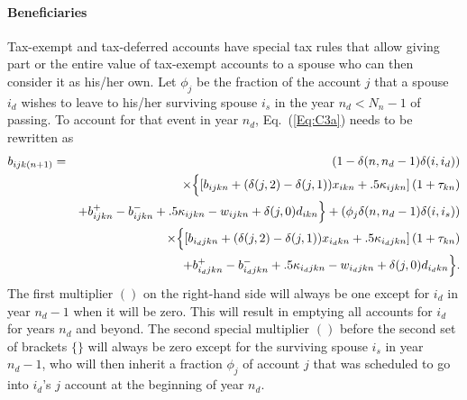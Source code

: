 \documentclass{article}[fleqn,12pt]
\begin{document}
\paragraph*{Beneficiaries}
Tax-exempt and tax-deferred accounts have special tax rules that allow giving part
or the entire value of
tax-exempt accounts to a spouse who can then consider it as his/her own.
Let $\phi_j$ be the fraction of the account $j$ that a spouse $i_d$ wishes
to leave to his/her surviving spouse $i_s$
in the year $n_d < N_n - 1$ of passing. 
To account for that event in year $n_d$, Eq.~(\ref{Eq:C3a}) needs to be rewritten as
\begin{eqnarray}
	b_{ijk(n+1)} &=& (1 - \delta(n, n_d-1)\delta(i, i_d)) \nonumber \\
	&&\times \Bigl\{\left[b_{ijkn} + (\delta(j, 2) - \delta(j, 1))x_{ikn}
	+ .5\kappa_{ijkn}\right](1 + \tau_{kn}) 
	\nonumber \\
	&& +  b^+_{ijkn} - b^-_{ijkn} + .5 \kappa_{ijkn} - w_{ijkn} + \delta(j, 0)d_{ikn} \Bigr\}
	+ (\phi_j\delta(n, n_d-1)\delta(i, i_s)) \nonumber  \\
	&& \times \Bigl\{\left[b_{i_djkn} + (\delta(j, 2) - \delta(j, 1))x_{i_dkn}
	+ .5\kappa_{i_djkn}\right](1 + \tau_{kn}) 
	\nonumber \\
	&& + b^+_{i_djkn} - b^-_{i_djkn} + .5 \kappa_{i_djkn} - w_{i_djkn} + \delta(j, 0)d_{i_dkn}\Bigr\} .
\end{eqnarray}
The first multiplier $()$ on the right-hand side will always be one except for $i_d$ in
year $n_d-1$ when it will be zero. This will result in emptying all accounts for $i_d$ for years
$n_d$ and beyond.
The second special multiplier $()$ before the second set of brackets
$\{\}$ will always be zero except for the surviving
spouse $i_s$ in year $n_d-1$, who will then inherit a fraction $\phi_j$ of account $j$ that
was scheduled to go into $i_d$'s $j$ account at the beginning of year $n_d$.
\end{document}
